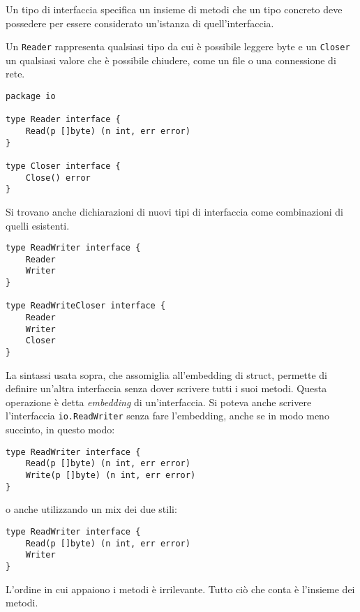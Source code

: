 Un tipo di interfaccia specifica un insieme di metodi che un tipo concreto deve possedere per essere considerato un'istanza di quell'interfaccia.

Un \verb|Reader| rappresenta qualsiasi tipo da cui è possibile leggere byte e un \verb|Closer| un qualsiasi valore che è possibile chiudere, come un file o una connessione di rete.
\begin{lstlisting}[frame=single, label={lst:lstlisting6-2.1}]
package io

type Reader interface {
    Read(p []byte) (n int, err error)
}

type Closer interface {
    Close() error
}
\end{lstlisting}
Si trovano anche dichiarazioni di nuovi tipi di interfaccia come combinazioni di quelli esistenti.
\begin{lstlisting}[frame=single, label={lst:lstlisting6-2.2}]
type ReadWriter interface {
    Reader
    Writer
}

type ReadWriteCloser interface {
    Reader
    Writer
    Closer
}
\end{lstlisting}
La sintassi usata sopra, che assomiglia all'embedding di struct, permette di definire un'altra interfaccia senza dover scrivere tutti i suoi metodi.
Questa operazione è detta \textit{embedding} di un'interfaccia.
Si poteva anche scrivere l'interfaccia \verb|io.ReadWriter| senza fare l'embedding, anche se in modo meno succinto, in questo modo:
\begin{lstlisting}[frame=single, label={lst:lstlisting6-2.3}]
type ReadWriter interface {
    Read(p []byte) (n int, err error)
    Write(p []byte) (n int, err error)
}
\end{lstlisting}
o anche utilizzando un mix dei due stili:
\begin{lstlisting}[frame=single, label={lst:lstlisting6-2.4}]
type ReadWriter interface {
    Read(p []byte) (n int, err error)
    Writer
}
\end{lstlisting}
L'ordine in cui appaiono i metodi è irrilevante.
Tutto ciò che conta è l'insieme dei metodi.